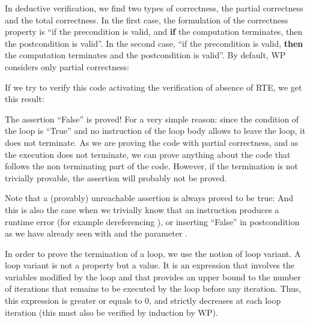\label{l3:statements-loops-variant}


In deductive verification, we find two types of correctness, the partial
correctness and the total correctness. In the first case, the
formulation of the correctness property is ``if the precondition is
valid, and \textbf{if} the computation terminates, then the
postcondition is valid''. In the second case, ``if the precondition is
valid, \textbf{then} the computation terminates and the postcondition is
valid''. By default, WP considers only partial correctness:






If we try to verify this code activating the verification of absence of
RTE, we get this result:






The assertion ``False'' is proved! For a very simple reason: since the
condition of the loop is ``True'' and no instruction of the loop body
allows to leave the loop, it does not terminate. As we are proving the
code with partial correctness, and as the execution does not terminate,
we can prove anything about the code that follows the non terminating
part of the code. However, if the termination is not trivially provable,
the assertion will probably not be proved.



\begin{Information}
  Note that a (provably) unreachable assertion is always proved to be true:
  And this is also the case when we trivially know that an instruction
  produces a runtime error (for example dereferencing ), or
  inserting ``False'' in postcondition as we have already seen with
   and the parameter .
\end{Information}


In order to prove the termination of a loop, we use the notion of loop
variant. A loop variant is not a property but a value. It is an
expression that involves the variables modified by the loop and that
provides an upper bound to the number of iterations that remains to be
executed by the loop before any iteration. Thus, this expression is
greater or equals to 0, and strictly decreases at each loop iteration
(this must also be verified by induction by WP).


